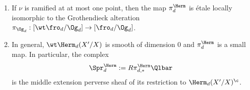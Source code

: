 \begin{prop}
\notready\label{p:SH Spr}
\begin{enumerate}
\item If $\nu$ is ramified at at most one point, then the map $\pi^{\Herm}_{d}$ is \'etale locally isomorphic to the Grothendieck alteration $\pi_{\Og_{d}}:[\wt\fro_{d}/\Og_{d}]\to [\fro_{d}/\Og_{d}]$.
\item In general, $\wt\Herm_{d}(X'/X)$ is smooth of dimension $0$ and $\pi^{\Herm}_{d}$ is a small map. In particular, the complex
\begin{equation*}
\Spr^{\Herm}_{d}:=R\pi^{\Herm}_{d,*}\Qlbar
\end{equation*}
is the middle extension perverse sheaf of its restriction to $\Herm_{d}(X'/X)^{\c}$.
\end{enumerate}
\end{prop}
